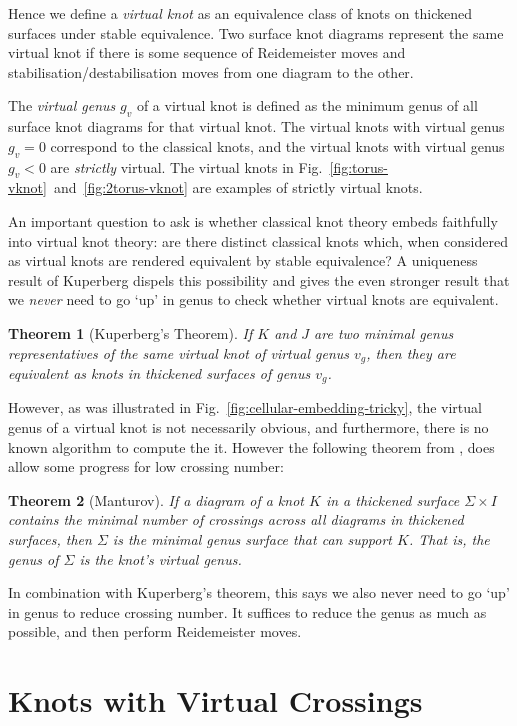 \documentclass[12pt]{report}
\newtheorem*{theorem}{Theorem}
\begin{document}
Hence we define a \textit{virtual knot} as an equivalence class of knots on thickened surfaces under stable equivalence. Two surface knot diagrams represent the same virtual knot if there is some sequence of Reidemeister moves and stabilisation/destabilisation moves from one diagram to the other.

The \textit{virtual genus} $g_{v}$ of a virtual knot is defined as the minimum genus of all surface knot diagrams for that virtual knot. The virtual knots with virtual genus $g_{v} = 0$ correspond to the classical knots, and the virtual knots with virtual genus $g_{v} < 0$ are \textit{strictly} virtual. The virtual knots in Fig.~\ref{fig:torus-vknot}~and~\ref{fig:2torus-vknot} are examples of strictly virtual knots.

An important question to ask is whether classical knot theory embeds faithfully into virtual knot theory: are there distinct classical knots which, when considered as virtual knots are rendered equivalent by stable equivalence? A uniqueness result of Kuperberg dispels this possibility and gives the even stronger result that we \textit{never} need to go `up' in genus to check whether virtual knots are equivalent.

\begin{theorem}[Kuperberg's Theorem]
If $K$ and $J$ are two minimal genus representatives of the same virtual knot of virtual genus $v_{g}$, then they are equivalent as knots in thickened surfaces of genus $v_{g}$.
\end{theorem}

However, as was illustrated in Fig.~\ref{fig:cellular-embedding-tricky}, the virtual genus of a virtual knot is not necessarily obvious, and furthermore, there is no known algorithm to compute the it. However the following theorem from \cite{parity-and-projection}, does allow some progress for low crossing number:
\begin{theorem}[Manturov]
	If a diagram of a knot $K$ in a thickened surface $\Sigma \times I$ contains the minimal number of crossings across all diagrams in thickened surfaces, then $\Sigma$ is the minimal genus surface that can support $K$. That is, the genus of $\Sigma$ is the knot's virtual genus.
\end{theorem}
In combination with Kuperberg's theorem, this says we also never need to go `up' in genus to reduce crossing number. It suffices to reduce the genus as much as possible, and then perform Reidemeister moves.


\section{Knots with Virtual Crossings}
\end{document}
